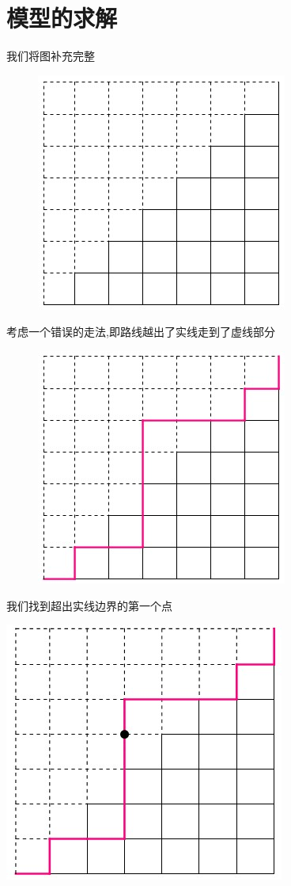 \documentclass[a4paper,cs4size,oneside,fancyhdr]{ctexrep}
\theoremstyle{nonumberplain}%
\theoremstyle{nonumberplain}%
\begin{document}
{{\chapter{模型的求解}
我们将图补充完整
\begin{figure}[htbp]%
\centering
\includegraphics[scale=1]{1.jpg}
\end{figure}

考虑一个错误的走法,即路线越出了实线走到了虚线部分

\begin{figure}[htbp]%
\centering
\includegraphics[scale=1]{2.jpg}
\end{figure}

我们找到超出实线边界的第一个点


\centering
\includegraphics[scale=1]{2-2.jpg}



}}
\end{document}
